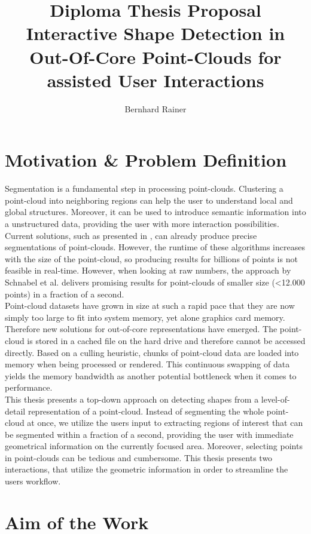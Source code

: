 \documentclass[]{article}
\title{\textbf{Diploma Thesis Proposal}\\
	\Large Interactive Shape Detection in Out-Of-Core Point-Clouds for assisted User Interactions}
\author{Bernhard Rainer}
\begin{document}
\maketitle

\section{Motivation \& Problem Definition}
Segmentation is a fundamental step in processing point-clouds. Clustering a point-cloud into neighboring regions can help the user to understand local and global structures. Moreover, it can be used to introduce semantic information into a unstructured data, providing the user with more interaction possibilities. Current solutions, such as presented in \cite{schnabel-2007-efficient}, \cite{schnabel-2007-ransac} can already produce precise segmentations of point-clouds. However, the runtime of these algorithms increases with the size of the point-cloud, so producing results for billions of points is not feasible in real-time. However, when looking at raw numbers, the approach by Schnabel et al. \cite{schnabel-2007-ransac} delivers promising results for point-clouds of smaller size (\textless 12.000 points) in a fraction of a second. 
\\
Point-cloud datasets have grown in size at such a rapid pace that they are now simply too large to fit into system memory, yet alone graphics card memory. Therefore new solutions for out-of-core representations have emerged. The point-cloud is stored in a cached file on the hard drive and therefore cannot be accessed directly. Based on a culling heuristic, chunks of point-cloud data are loaded into memory when being processed or rendered. This continuous swapping of data yields the memory bandwidth as another potential bottleneck when it comes to performance.
\\

This thesis presents a top-down approach on detecting shapes from a level-of-detail representation of a point-cloud. Instead of segmenting the whole point-cloud at once, we utilize the users input to extracting regions of interest that can be segmented within a fraction of a second, providing the user with immediate geometrical information on the currently focused area. Moreover, selecting points in point-clouds can be tedious and cumbersome. This thesis presents two interactions, that utilize the geometric information in order to streamline the users workflow. 


\section{Aim of the Work}
\end{document}
